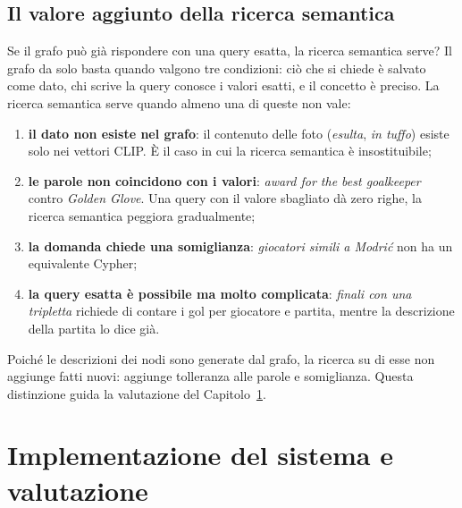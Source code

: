 \documentclass[11pt,a4paper]{article}
\begin{document}
\subsection{Il valore aggiunto della ricerca semantica}
Se il grafo può già rispondere con una query esatta, la ricerca semantica serve? Il grafo da solo basta quando valgono tre condizioni: ciò che si chiede è salvato come dato, chi scrive la query conosce i valori esatti, e il concetto è preciso. La ricerca semantica serve quando almeno una di queste non vale:
\begin{enumerate}
  \item \textbf{il dato non esiste nel grafo}: il contenuto delle foto (\emph{esulta}, \emph{in tuffo}) esiste solo nei vettori CLIP. È il caso in cui la ricerca semantica è insostituibile;
  \item \textbf{le parole non coincidono con i valori}: \emph{award for the best goalkeeper} contro \emph{Golden Glove}. Una query con il valore sbagliato dà zero righe, la ricerca semantica peggiora gradualmente;
  \item \textbf{la domanda chiede una somiglianza}: \emph{giocatori simili a Modrić} non ha un equivalente Cypher;
  \item \textbf{la query esatta è possibile ma molto complicata}: \emph{finali con una tripletta} richiede di contare i gol per giocatore e partita, mentre la descrizione della partita lo dice già.
\end{enumerate}
Poiché le descrizioni dei nodi sono generate dal grafo, la ricerca su di esse non aggiunge fatti nuovi: aggiunge tolleranza alle parole e somiglianza. Questa distinzione guida la valutazione del Capitolo~\ref{sec:impl}.

\section{Implementazione del sistema e valutazione}\label{sec:impl}
\end{document}
